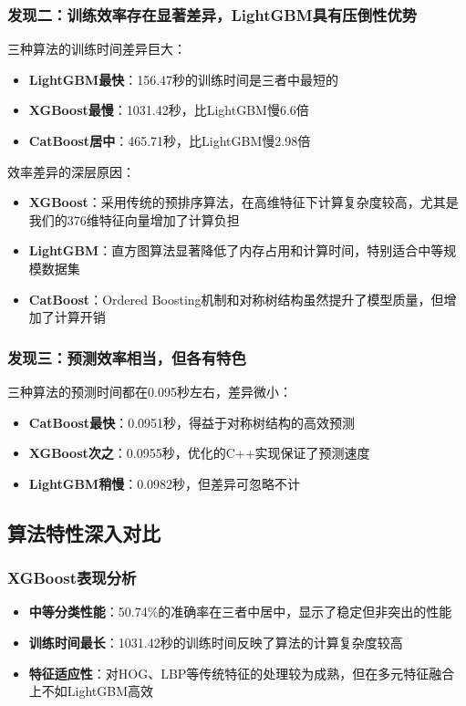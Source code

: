 \documentclass[UTF8]{report}
\theoremstyle{MyLineTheoremStyle} %
\theoremstyle{MyBlockTheoremStyle} %
\theoremstyle{MySubsubsectionStyle} %
\begin{document}
\subsubsection{发现二：训练效率存在显著差异，LightGBM具有压倒性优势}
三种算法的训练时间差异巨大：
\begin{itemize}
    \item \textbf{LightGBM最快}：156.47秒的训练时间是三者中最短的
    \item \textbf{XGBoost最慢}：1031.42秒，比LightGBM慢6.6倍
    \item \textbf{CatBoost居中}：465.71秒，比LightGBM慢2.98倍
\end{itemize}
效率差异的深层原因：
\begin{itemize}
    \item \textbf{XGBoost}：采用传统的预排序算法，在高维特征下计算复杂度较高，尤其是我们的376维特征向量增加了计算负担
    \item \textbf{LightGBM}：直方图算法显著降低了内存占用和计算时间，特别适合中等规模数据集
    \item \textbf{CatBoost}：Ordered Boosting机制和对称树结构虽然提升了模型质量，但增加了计算开销
\end{itemize}

\subsubsection{发现三：预测效率相当，但各有特色}
三种算法的预测时间都在0.095秒左右，差异微小：
\begin{itemize}
    \item \textbf{CatBoost最快}：0.0951秒，得益于对称树结构的高效预测
    \item \textbf{XGBoost次之}：0.0955秒，优化的C++实现保证了预测速度
    \item \textbf{LightGBM稍慢}：0.0982秒，但差异可忽略不计
\end{itemize}

\subsection{算法特性深入对比}
\subsubsection{XGBoost表现分析}
\begin{itemize}
    \item \textbf{中等分类性能}：50.74\%的准确率在三者中居中，显示了稳定但非突出的性能
    \item \textbf{训练时间最长}：1031.42秒的训练时间反映了算法的计算复杂度较高
    \item \textbf{特征适应性}：对HOG、LBP等传统特征的处理较为成熟，但在多元特征融合上不如LightGBM高效
\end{itemize}
\end{document}
